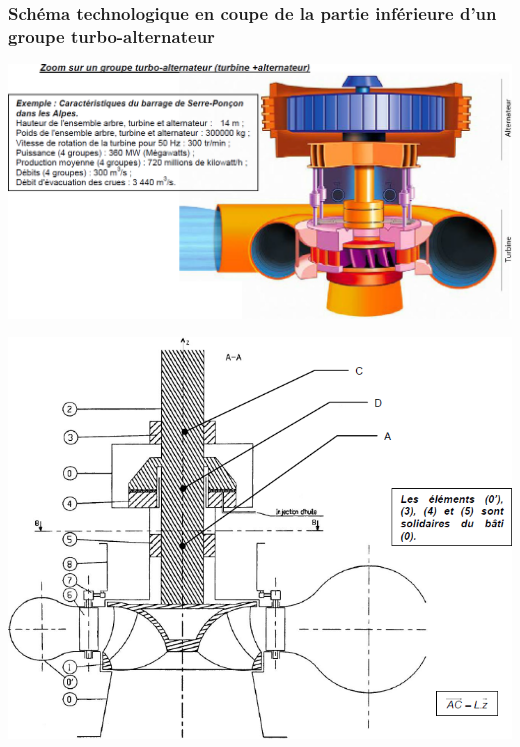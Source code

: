 \documentclass[10pt]{article}
\begin{document}
\subsubsection*{Schéma technologique en coupe de la partie inférieure d’un groupe turbo-alternateur}


\begin{minipage}[c]{.47\linewidth}
\begin{center}
\includegraphics[width=.95\textwidth]{images/fig01_2}
\end{center}
\end{minipage} \hfill
\begin{minipage}[c]{.47\linewidth}
\begin{center}
\includegraphics[width=.95\textwidth]{images/fig01_3}
\end{center}
\end{minipage} 
\end{document}
